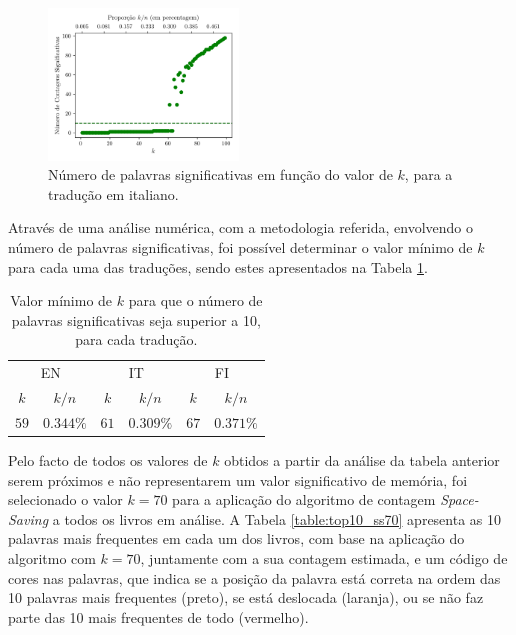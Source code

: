 \documentclass[mirror, portugues]{revdetua}
\begin{document}
\begin{figure}[H]
    \centering
    \includegraphics[width=0.45\textwidth]{../assets/ss_signcount.png}
    \caption{Número de palavras significativas em função do valor de $k$, para a tradução em italiano.}
    \label{fig:meaningful_wordscount_k}
\end{figure}

Através de uma análise numérica, com a metodologia referida, envolvendo o número de palavras significativas, foi possível determinar o valor mínimo de $k$ para cada uma das traduções, sendo estes apresentados na Tabela \ref{table:min_k_for_SStop10}.

\begin{table}[H]
\centering
\caption{Valor mínimo de $k$ para que o número de palavras significativas seja superior a 10, para cada tradução.}
\label{table:min_k_for_SStop10}
\begin{tabular}{cc|cc|cc}
\toprule
\multicolumn{2}{c}{EN} & \multicolumn{2}{c}{IT} & \multicolumn{2}{c}{FI} \\
$k$ & $k/n$ & $k$ & $k/n$ & $k$ & $k/n$ \\
\midrule
$59$ & $0.344\%$ & $61$ & $0.309\%$ & $67$ & $0.371\%$ \\
\bottomrule
\end{tabular}
\end{table}

Pelo facto de todos os valores de $k$ obtidos a partir da análise da tabela anterior serem próximos e não representarem um valor significativo de memória, foi selecionado o valor $k = 70$ para a aplicação do algoritmo de contagem \textit{Space-Saving} a todos os livros em análise. A Tabela \ref{table:top10_ss70} apresenta as 10 palavras mais frequentes em cada um dos livros, com base na aplicação do algoritmo com $k = 70$, juntamente com a sua contagem estimada, e um código de cores nas palavras, que indica se a posição da palavra está correta na ordem das 10 palavras mais frequentes (preto), se está deslocada (laranja), ou se não faz parte das 10 mais frequentes de todo (vermelho).
\end{document}
